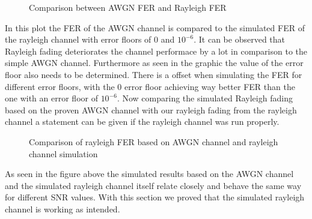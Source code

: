 \begin{figure}[!h]
	\setlength{}
	\setlength\fheight{0.4\textheight}
	\centering
	
	\caption{Comparison between AWGN FER and Rayleigh FER}
	\label{fig:FERAWGNRAY}
\end{figure}
\newpage
In this plot the \gls{FER} of the AWGN channel is compared to the simulated \gls{FER} of the rayleigh channel with error floors of $0$ and $10^{-6}$. It can be observed that Rayleigh fading deteriorates the channel performace by a lot in comparison to the simple AWGN channel. Furthermore as seen in the graphic the value of the error floor also needs to be determined. There is a offset when simulating the \gls{FER} for different error floors, with the 0 error floor achieving way better \gls{FER} than the one with an error floor of $10^{-6}$. Now comparing the simulated Rayleigh fading based on the proven AWGN channel with our rayleigh fading from the rayleigh channel a statement can be given if the rayleigh channel was run properly.
\newpage
\begin{figure}[!htb]
	\setlength{}
	\setlength\fheight{0.4\textheight}
	\centering
	
	\caption{Comparison of rayleigh FER based on AWGN channel and rayleigh channel simulation}
	\label{fig:AWGNRAY}
\end{figure}
As seen in the figure above the simulated results based on the AWGN channel and the simulated rayleigh channel itself relate closely and behave the same way for different \gls{SNR} values. With this section we proved that the simulated rayleigh channel is working as intended. 

\clearpage


